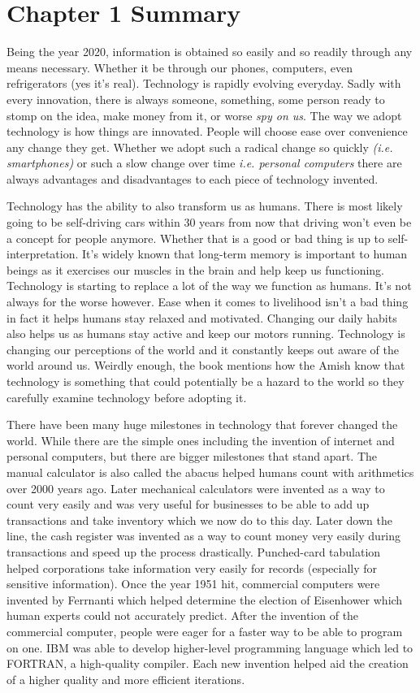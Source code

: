 \documentclass[12pt,a4paper]{article}
\begin{document}
\section{Chapter 1 Summary}
    Being the year 2020, information is obtained so easily and so readily through any means necessary. Whether it be through our phones, computers, even refrigerators (yes it's real). Technology is rapidly evolving everyday. Sadly with every innovation, there is always someone, something, some person ready to stomp on the idea, make money from it, or worse \emph{spy on us}. The way we adopt technology is how things are innovated. People will choose ease over convenience any change they get. Whether we adopt such a radical change so quickly \emph{(i.e. smartphones)} or such a slow change over time \emph{i.e. personal computers} there are always advantages and disadvantages to each piece of technology invented.\par
    Technology has the ability to also transform us as humans. There is most likely going to be self-driving cars within 30 years from now that driving won't even be a concept for people anymore. Whether that is a good or bad thing is up to self-interpretation. It's widely known that long-term memory is important to human beings as it exercises our muscles in the brain and help keep us functioning. Technology is starting to replace a lot of the way we function as humans. It's not always for the worse however. Ease when it comes to livelihood isn't a bad thing in fact it helps humans stay relaxed and motivated. Changing our daily habits also helps us as humans stay active and keep our motors running. Technology is changing our perceptions of the world and it constantly keeps out aware of the world around us. Weirdly enough, the book mentions how the Amish know that technology is something that could potentially be a hazard to the world so they carefully examine technology before adopting it.\par
    There have been many huge milestones in technology that forever changed the world. While there are the simple ones including the invention of internet and personal computers, but there are bigger milestones that stand apart. The manual calculator is also called the abacus helped humans count with arithmetics over 2000 years ago. Later mechanical calculators were invented as a way to count very easily and was very useful for businesses to be able to add up transactions and take inventory which we now do to this day. Later down the line, the cash register was invented as a way to count money very easily during transactions and speed up the process drastically. Punched-card tabulation helped corporations take information very easily for records (especially for sensitive information). Once the year 1951 hit, commercial computers were invented by Ferrnanti which helped determine the election of Eisenhower which human experts could not accurately predict. After the invention of the commercial computer, people were eager for a faster way to be able to program on one. IBM was able to develop higher-level programming language which led to FORTRAN, a high-quality compiler. Each new invention helped aid the creation of a higher quality and more efficient iterations.
\end{document}
